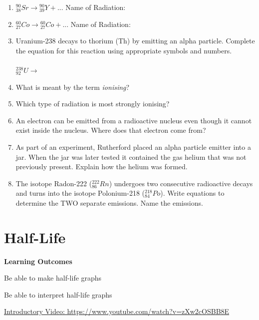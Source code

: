 \documentclass[12pt]{report}
\begin{document}
{\begin{enumerate}[itemsep=1cm]
	\item ${}^{90}_{38}Sr \rightarrow {}^{90}_{39}Y + ...$ \hspace{2cm} Name of Radiation:
	\item ${}^{60}_{27}Co \rightarrow {}^{60}_{27}Co + ...$ \hspace{2cm} Name of Radiation:
	\item Uranium-238 decays to thorium (Th) by emitting an alpha particle. Complete the equation for this reaction using appropriate symbols and numbers.\\\\
	${}^{238}_{92}U \rightarrow$
	\item What is meant by the term \textit{ionising}?
	\item Which type of radiation is most strongly ionising?
	\item An electron can be emitted from a radioactive nucleus even though it cannot exist inside the nucleus. Where does that electron come from?\vspace{1cm}
	\item As part of an experiment, Rutherford placed an alpha particle emitter into a jar. When the jar was later tested it contained the gas helium that was not previously present. Explain how the helium was formed.\vspace{1cm}
	\item The isotope Radon-222 (${}^{222}_{86}Rn$) undergoes two consecutive radioactive decays and turns into the isotope Polonium-218 (${}^{218}_{84}Po$). Write equations to determine the TWO separate emissions. Name the emissions.\vspace{1cm}
\end{enumerate}


\newpage
\chapter{Half-Life}

\noindent\textbf{Learning Outcomes}
\begin{nwa}
	\item Be able to make half-life graphs
	\item Be able to interpret half-life graphs
\end{nwa}

\noindent\href{https://www.youtube.com/watch?v=zXw2cOSBB8E}{Introductory Video: https://www.youtube.com/watch?v=zXw2cOSBB8E}

}
\end{document}
